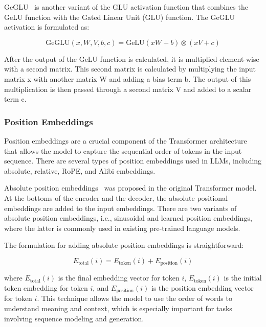 GeGLU~\cite{shazeer2020glu} is another variant of the GLU activation function that combines the GeLU function with the Gated Linear Unit (GLU) function.
The GeGLU activation is formulated as:

\begin{equation}
	\text{GeGLU}\left(x, W, V, b, c\right) = \text{GeLU}\left(xW + b\right) \otimes \left(xV + c\right)
	\label{eq:geglu}
\end{equation}

\noindent After the output of the GeLU function is calculated, it is multiplied element-wise with a second matrix.
This second matrix is calculated by multiplying the input matrix x with another matrix W and adding a bias term b.
The output of this multiplication is then passed through a second matrix V and added to a scalar term c.

\subsubsection{Position Embeddings}
\label{subsubsec:position-embeddings}

Position embeddings are a crucial component of the Transformer architecture that allows the model to capture the sequential order of tokens in the input sequence.
There are several types of position embeddings used in LLMs, including absolute, relative, RoPE, and Alibi embeddings.

Absolute position embeddings~\cite{vaswani2023attention} was proposed in the original Transformer model.
At the bottoms of the encoder and the decoder, the absolute positional embeddings are added to the input embeddings.
There are two variants of absolute position embeddings, i.e., sinusoidal and learned position embeddings, where the latter is commonly used in existing pre-trained language models.

The formulation for adding absolute position embeddings is straightforward:

\begin{equation}
	E_{\text{total}}(i) = E_{\text{token}}(i) + E_{\text{position}}(i)
	\label{eq:absolute-position-embeddings}
\end{equation}

\noindent where \(E_{\text{total}}(i)\) is the final embedding vector for token \(i\), \(E_{\text{token}}(i)\) is the initial token embedding for token \(i\), and \(E_{\text{position}}(i)\) is the position embedding vector for token \(i\).
This technique allows the model to use the order of words to understand meaning and context, which is especially important for tasks involving sequence modeling and generation.


